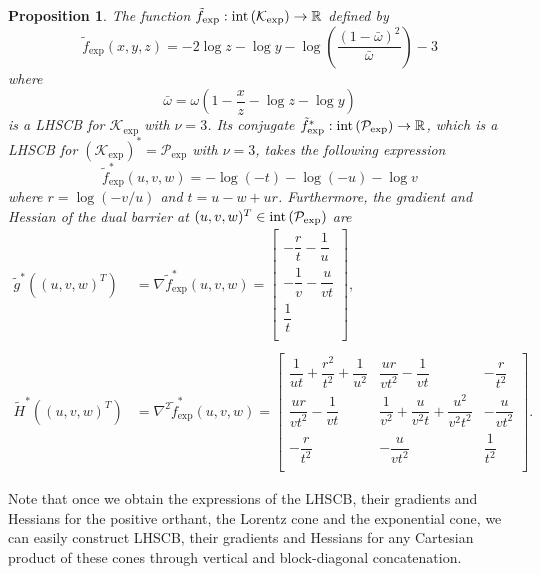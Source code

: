 \documentclass[11pt]{article}
\theoremstyle{definition}
\theoremstyle{plain}
\newtheorem{prop}{Proposition}
\def\interior{\protect{\textnormal{int}}}
\begin{document}
\begin{prop}
	The function $\tilde{f}_{\exp}: \textnormal{int}\left(\mathcal{K}_{\exp}\right)\rightarrow \mathbb{R}$ defined by
	\[\tilde{f}_{\exp}(x,y,z) = -2 \log z - \log y  - \log \left(\dfrac{(1-\bar{\omega})^2}{\bar{\omega}}\right) - 3 \]
	where 
	\[\bar{\omega} = \omega\left(1-\dfrac{x}{z} - \log z - \log y\right) \]
	is a LHSCB for $\mathcal{K}_{\exp}$ with $\nu = 3$. Its conjugate $\tilde{f}_{\exp}^*: \textnormal{int}\left(\mathcal{P}_{\exp}\right) \rightarrow \mathbb{R}$, which is a LHSCB for $\left(\mathcal{K}_{\exp}\right)^* = \mathcal{P}_{\exp}$ with $\nu=3$, takes the following expression 
	\[\tilde{f}_{\exp}^*(u,v,w) = -\log\left(-t\right) - \log (-u) - \log v\]
	where $r = \log \left(-v/u\right)$ and $t=u-w+ur$.  Furthermore, the gradient and Hessian of the dual barrier at $(u,v,w)^T \in \interior\left(\mathcal{P}_{\exp}\right)$ are \\
	\begin{align*}
	\tilde{g}^*\left((u,v,w)^T\right) &= \nabla \tilde{f}^*_{\exp}(u,v,w) =  
	\begin{bmatrix}
	-\dfrac{r}{t} - \dfrac{1}{u} \\[2ex]
	-\dfrac{1}{v} - \dfrac{u}{vt} \\[2ex]
	\dfrac{1}{t} \\[1ex]
	\end{bmatrix}, \\ \\
	\tilde{H}^*\left((u,v,w)^T\right) &= \nabla^2 \tilde{f}^*_{\exp}(u,v,w) =  
	\begin{bmatrix}
	\dfrac{1}{ut} + \dfrac{r^2}{t^2}+ \dfrac{1}{u^2} & \dfrac{ur}{vt^2} - \dfrac{1}{vt} & -\dfrac{r}{t^2} \\[2ex]
	\dfrac{ur}{vt^2} - \dfrac{1}{vt}  & \dfrac{1}{v^2}+\dfrac{u}{v^2t} + \dfrac{u^2}{v^2t^2} & -\dfrac{u}{vt^2} \\[2ex]
	-\dfrac{r}{t^2}	& -\dfrac{u}{vt^2} & \dfrac{1}{t^2} \\[1.5ex]
	\end{bmatrix}.
	\end{align*}
\end{prop}
Note that once we obtain the expressions of the LHSCB, their gradients and Hessians for the positive orthant, the Lorentz cone and the exponential cone, we can easily construct LHSCB, their gradients and Hessians for any Cartesian product of these cones through vertical and block-diagonal concatenation.
\end{document}
